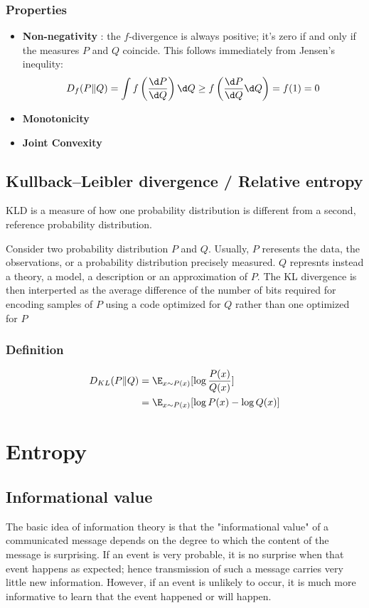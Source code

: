 \subsubsection{Properties}
\begin{itemize}
    \item \textbf{Non-negativity} : the $f$-divergence is always positive; it's zero if and only if
    the measures $P$ and $Q$ coincide. This follows immediately from Jensen's inequlity:
    \begin{equation}
        D_f(P\|Q) = \int f \left(\frac{\d P}{\d Q}\right) \d Q \geq f\left(\frac{\d P}{\d Q} \d Q\right) = f(1) = 0
    \end{equation}
    \item \textbf{Monotonicity}
    \item \textbf{Joint Convexity}
\end{itemize}

\subsection{Kullback–Leibler divergence / Relative entropy}
KLD  is a measure of how one probability distribution is different from a second, reference probability distribution.

Consider two probability distribution $P$ and $Q$. Usually, $P$ reresents the data, the observations, or a probability
distribution precisely measured. $Q$ represnts instead a theory, a model, a description or an approximation of $P$.
The KL divergence is then interperted as the average difference of the number of bits required for encoding samples of $P$
using a code optimized for $Q$ rather than one optimized for $P$

\subsubsection{Definition}
\begin{equation}
    \begin{split}
        D_{KL}(P\|Q)
        &= \E_{x \sim P(x)}[\log \frac{P(x)}{Q(x)}] \\
        &= \E_{x \sim P(x)} [\log P(x) - \log Q(x)]
    \end{split}
\end{equation}

\section{Entropy}
\subsection{Informational value}
The basic idea of information theory is that the "informational value" of a communicated message depends on the
degree to which the content of the message is surprising. If an event is very probable, it is no surprise
when that event happens as expected; hence transmission of such a message carries very little new information.
However, if an event is unlikely to occur, it is much more informative to learn that the event happened or will happen.

